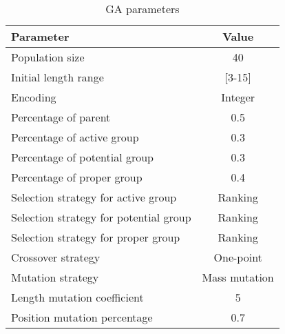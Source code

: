 \begin{table}[!ht]
\centering
\caption{GA parameters}
\begin{adjustbox}{width=0.45\textwidth}
\label{tab:ga}
\begin{tabular}{lc}
\toprule
Parameter								&  Value  \\
\midrule
Population size							& 40        \\
Initial length range					& [3-15]    \\
Encoding								& Integer   \\
Percentage of parent                    & 0.5   \\
Percentage of active group				& 0.3   \\
Percentage of potential group			& 0.3   \\
Percentage of proper group				& 0.4   \\
Selection strategy for  active group	& Ranking   \\
Selection strategy for potential group	& Ranking   \\
Selection strategy for proper group	    & Ranking   \\
Crossover strategy			    		& One-point \\
Mutation strategy			    		& Mass mutation \\
Length mutation coefficient             & 5 \\
Position mutation percentage            & 0.7 \\
\bottomrule
\end{tabular}
\end{adjustbox}
\end{table}
